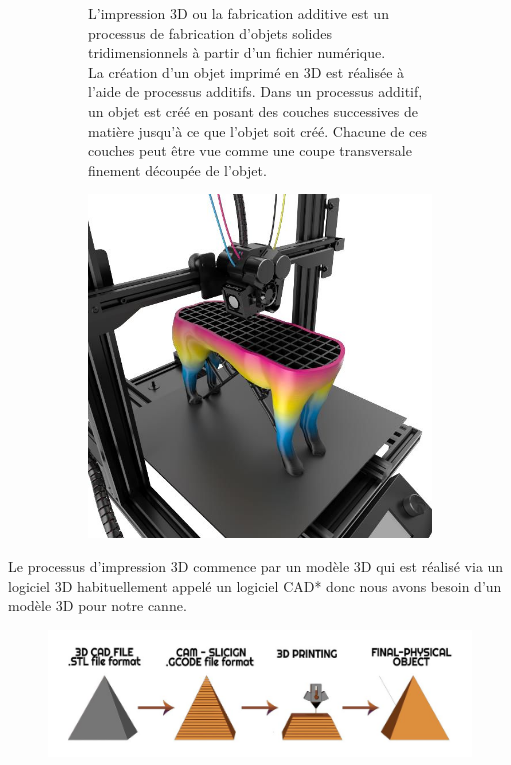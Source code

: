 \begin{figure}[!htbp]
    \centering
    \begin{subfigure}[m]{.55\linewidth}
        L’impression 3D ou la fabrication additive est un processus de fabrication d’objets solides tridimensionnels à partir d’un fichier numérique. \\
        La création d’un objet imprimé en 3D est réalisée à l’aide de processus additifs. Dans un processus additif, un objet est créé en posant des couches successives de matière jusqu’à ce que l’objet soit créé. Chacune de ces couches peut être vue comme une coupe transversale finement découpée de l’objet.
    \end{subfigure}
    \hfill
    \begin{subfigure}[m]{.4\linewidth}
        \centering
        \includegraphics[width=\textwidth]{assets/conception1/img116.jpg}
    \end{subfigure}
\end{figure}

\FloatBarrier

Le processus d’impression 3D commence par un modèle 3D qui est réalisé via un logiciel 3D habituellement appelé un logiciel CAD*  donc nous avons besoin d’un modèle 3D pour notre canne.

\begin{figure}[!htbp]
    \centering
    \includegraphics[width=\linewidth]{assets/conception1/img118.jpg}
\end{figure}

